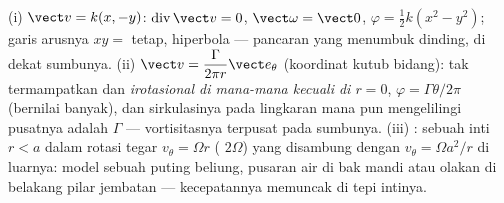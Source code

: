 \begin{example}\label{ex:b2:fluid-kinematics:planeflows}
(i) \emph{} $\vect v = k(x, -y)$: $\operatorname{div}\vect v =
0$, $\vect\omega = \vect 0$, $\varphi = \tfrac12k(x^2 - y^2)$; garis arusnya
$xy =$ tetap, hiperbola --- pancaran yang menumbuk dinding, di dekat sumbunya. (ii)
\emph{} $\vect v = \dfrac{\Gamma}{2\pi r}\vect e_\theta$ (koordinat
kutub bidang): tak termampatkan dan \emph{irotasional di mana-mana
kecuali di $r = 0$}, $\varphi = \Gamma\theta/2\pi$ (bernilai banyak), dan
sirkulasinya pada lingkaran mana pun mengelilingi pusatnya adalah $\Gamma$ --- 
vortisitasnya terpusat pada sumbunya. (iii) \emph{}: sebuah
inti $r < a$ dalam rotasi tegar $v_\theta = \Omega r$ ( $2\Omega$)
yang disambung dengan  $v_\theta = \Omega a^2/r$ di luarnya: model
sebuah puting beliung, pusaran air di bak mandi atau olakan di belakang pilar jembatan ---
kecepatannya memuncak di tepi intinya.
\end{example}

